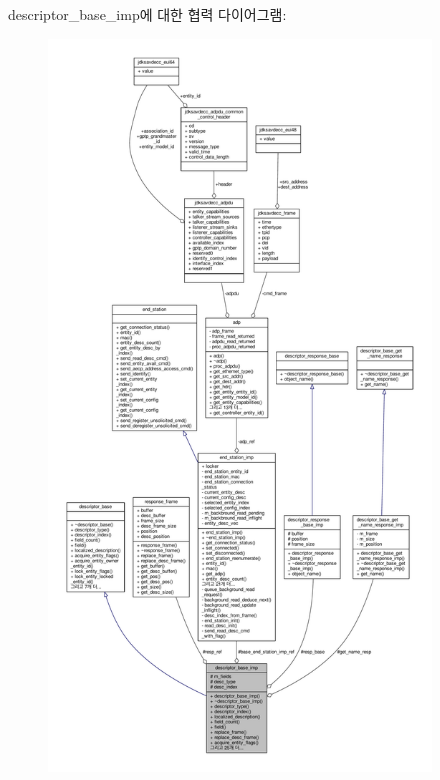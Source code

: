 descriptor\+\_\+base\+\_\+imp에 대한 협력 다이어그램\+:
\nopagebreak
\begin{figure}[H]
\begin{center}
\leavevmode
\includegraphics[height=550pt]{classavdecc__lib_1_1descriptor__base__imp__coll__graph}
\end{center}
\end{figure}
